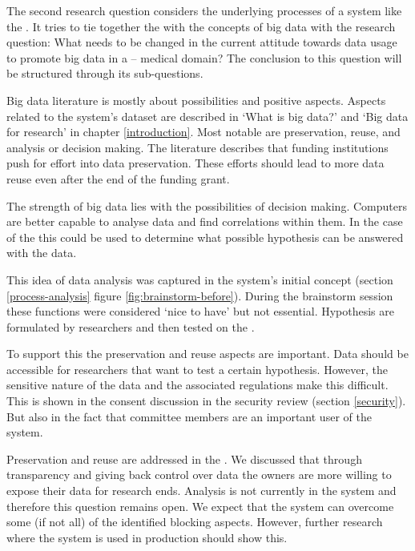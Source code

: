 The second research question considers the underlying processes of a system like the \ivfsystem{}.
It tries to tie together the \projectdata{} with the concepts of big data with the research question: What needs to be changed in the current attitude towards data usage to promote big data in a \IVF{}--\PRN{} medical domain?
The conclusion to this question will be structured through its sub-questions.

Big data literature is mostly about possibilities and positive aspects.
Aspects related to the system's dataset are described in `What is big data?' and `Big data for \project{} research' in chapter \ref{introduction}.
Most notable are preservation, reuse, and analysis or decision making.
The literature describes that funding institutions push for effort into data preservation.
These efforts should lead to more data reuse even after the end of the funding grant.

The strength of big data lies with the possibilities of decision making.
Computers are better capable to analyse data and find correlations within them.
In the case of the \project{} this could be used to determine what possible hypothesis can be answered with the data.

This idea of data analysis was captured in the system's initial concept (section \ref{process-analysis} figure \ref{fig:brainstorm-before}).
During the brainstorm session these functions were considered `nice to have' but not essential.
Hypothesis are formulated by researchers and then tested on the \projectdata{}.

To support this the preservation and reuse aspects are important.
Data should be accessible for researchers that want to test a certain hypothesis.
However, the sensitive nature of the data and the associated regulations make this difficult.
This is shown in the consent discussion in the security review (section \ref{security}).
But also in the fact that committee members are an important user of the system.

Preservation and reuse are addressed in the \project{}.
We discussed that through transparency and giving back control over data the owners are more willing to expose their data for research ends.
Analysis is not currently in the system and therefore this question remains open.
We expect that the system can overcome some (if not all) of the identified blocking aspects.
However, further research where the system is used in production should show this.